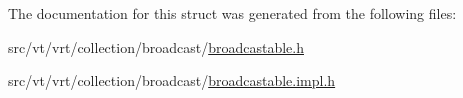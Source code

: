 The documentation for this struct was generated from the following files\+:\begin{DoxyCompactItemize}
\item 
src/vt/vrt/collection/broadcast/\hyperlink{broadcastable_8h}{broadcastable.\+h}\item 
src/vt/vrt/collection/broadcast/\hyperlink{broadcastable_8impl_8h}{broadcastable.\+impl.\+h}\end{DoxyCompactItemize}
